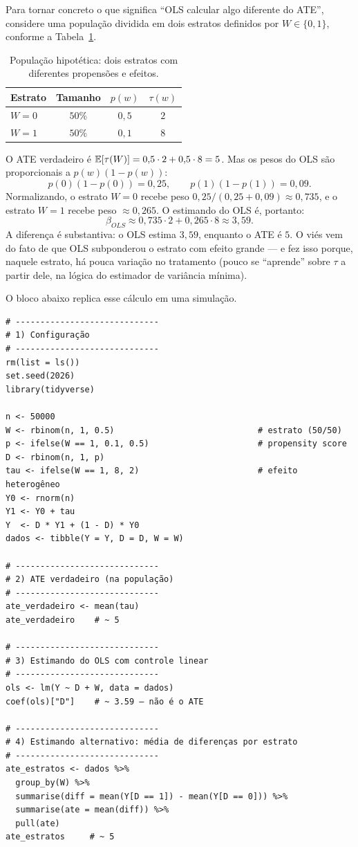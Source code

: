 Para tornar concreto o que significa ``OLS calcular algo diferente do ATE'', considere uma população dividida em dois estratos definidos por $W \in \{0, 1\}$, conforme a Tabela~\ref{tab:pesos-ols}.

\begin{table}[h]
\centering
\caption{População hipotética: dois estratos com diferentes propensões e efeitos.}
\label{tab:pesos-ols}
\begin{tabular}{lccc}
\toprule
Estrato & Tamanho & $p(w)$ & $\tau(w)$ \\
\midrule
$W = 0$ & $50\%$ & $0{,}5$ & $2$ \\
$W = 1$ & $50\%$ & $0{,}1$ & $8$ \\
\bottomrule
\end{tabular}
\end{table}

O ATE verdadeiro é $\mathbb{E}[\tau(W)] = 0{,}5 \cdot 2 + 0{,}5 \cdot 8 = 5$. Mas os pesos do OLS são proporcionais a $p(w)(1-p(w))$:
\[
p(0)(1-p(0)) = 0{,}25, \qquad p(1)(1-p(1)) = 0{,}09.
\]
Normalizando, o estrato $W=0$ recebe peso $0{,}25/(0{,}25+0{,}09) \approx 0{,}735$, e o estrato $W=1$ recebe peso $\approx 0{,}265$. O estimando do OLS é, portanto:
\[
\beta_{OLS} \approx 0{,}735 \cdot 2 + 0{,}265 \cdot 8 \approx 3{,}59.
\]
A diferença é substantiva: o OLS estima $3{,}59$, enquanto o ATE é $5$. O viés vem do fato de que OLS subponderou o estrato com efeito grande --- e fez isso porque, naquele estrato, há pouca variação no tratamento (pouco se ``aprende'' sobre $\tau$ a partir dele, na lógica do estimador de variância mínima).

O bloco abaixo replica esse cálculo em uma simulação.

\begin{lstlisting}[caption={OLS vs. ATE quando os pesos do estimador não coincidem com os de política.}, label={lst:angrist-pesos}]
# -----------------------------
# 1) Configuração
# -----------------------------
rm(list = ls())
set.seed(2026)
library(tidyverse)

n <- 50000
W <- rbinom(n, 1, 0.5)                             # estrato (50/50)
p <- ifelse(W == 1, 0.1, 0.5)                      # propensity score
D <- rbinom(n, 1, p)
tau <- ifelse(W == 1, 8, 2)                        # efeito heterogêneo
Y0 <- rnorm(n)
Y1 <- Y0 + tau
Y  <- D * Y1 + (1 - D) * Y0
dados <- tibble(Y = Y, D = D, W = W)

# -----------------------------
# 2) ATE verdadeiro (na população)
# -----------------------------
ate_verdadeiro <- mean(tau)
ate_verdadeiro    # ~ 5

# -----------------------------
# 3) Estimando do OLS com controle linear
# -----------------------------
ols <- lm(Y ~ D + W, data = dados)
coef(ols)["D"]    # ~ 3.59 — não é o ATE

# -----------------------------
# 4) Estimando alternativo: média de diferenças por estrato
# -----------------------------
ate_estratos <- dados %>%
  group_by(W) %>%
  summarise(diff = mean(Y[D == 1]) - mean(Y[D == 0])) %>%
  summarise(ate = mean(diff)) %>%
  pull(ate)
ate_estratos     # ~ 5
\end{lstlisting}

